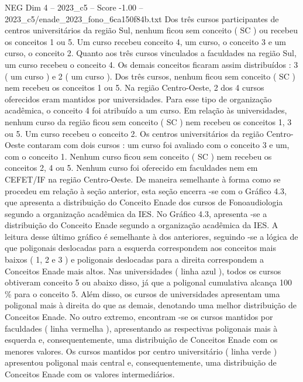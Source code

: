 \begin{textsample}{NEG Dim 4 – 2023\_c5 – Score -1.00 – 2023\_c5/enade\_2023\_fono\_6ca150f84b.txt}
Dos três cursos participantes de centros universitários da região Sul, nenhum ficou sem conceito ( SC ) ou recebeu os conceitos 1 ou 5.
Um curso recebeu conceito 4, um curso, o conceito 3 e um curso, o conceito 2.
Quanto aos três cursos vinculados a faculdades na região Sul, um curso recebeu o conceito 4.
Os demais conceitos ficaram assim distribuídos : 3 ( um curso ) e 2 ( um curso ).
Dos três cursos, nenhum ficou sem conceito ( SC ) nem recebeu os conceitos 1 ou 5.
Na região Centro-Oeste, 2 dos 4 cursos oferecidos eram mantidos por universidades.
Para esse tipo de organização acadêmica, o conceito 4 foi atribuído a um curso.
Em relação às universidades, nenhum curso da região ficou sem conceito ( SC ) nem recebeu os conceitos 1, 3 ou 5.
Um curso recebeu o conceito 2.
Os centros universitários da região Centro-Oeste contaram com dois cursos : um curso foi avaliado com o conceito 3 e um, com o conceito 1.
Nenhum curso ficou sem conceito ( SC ) nem recebeu os conceitos 2, 4 ou 5.
Nenhum curso foi oferecido em faculdades nem em CEFET/IF na região Centro-Oeste.
De maneira semelhante à forma como se procedeu em relação à seção anterior, esta seção encerra -se com o Gráfico 4.3, que apresenta a distribuição do Conceito Enade dos cursos de Fonoaudiologia segundo a organização acadêmica da IES.
No Gráfico 4.3, apresenta -se a distribuição do Conceito Enade segundo a organização acadêmica da IES.
A leitura desse último gráfico é semelhante à dos anteriores, seguindo -se a lógica de que poligonais deslocadas para a esquerda correspondem aos conceitos mais baixos ( 1, 2 e 3 ) e poligonais deslocadas para a direita correspondem a Conceitos Enade mais altos.
Nas universidades ( linha azul ), todos os cursos obtiveram conceito 5 ou abaixo disso, já que a poligonal cumulativa alcança 100 \% para o conceito 5.
Além disso, os cursos de universidades apresentam uma poligonal mais à direita do que as demais, denotando uma melhor distribuição de Conceitos Enade.
No outro extremo, encontram -se os cursos mantidos por faculdades ( linha vermelha ), apresentando as respectivas poligonais mais à esquerda e, consequentemente, uma distribuição de Conceitos Enade com os menores valores.
Os cursos mantidos por centro universitário ( linha verde ) apresentou poligonal mais central e, consequentemente, uma distribuição de Conceitos Enade com os valores intermediários.

\end{textsample}

